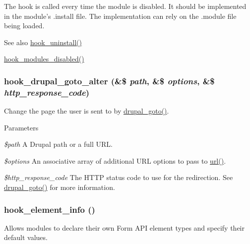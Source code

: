 The hook is called every time the module is disabled. It should be implemented in the module's .install file. The implementation can rely on the .module file being loaded.

\begin{DoxySeeAlso}{See also}
\hyperlink{group__hooks_ga3fb24f6923b3e585d6326ff5abdcc57c}{hook\_\-uninstall()} 

\hyperlink{group__hooks_ga591c577fba8ca8dc8ec17f8bf80bdc4c}{hook\_\-modules\_\-disabled()} 
\end{DoxySeeAlso}
\hypertarget{group__hooks_ga3c043f34f18e1c77daa341038a28e1ba}{
\subsubsection[{hook\_\-drupal\_\-goto\_\-alter}]{\setlength{\rightskip}{0pt plus 5cm}hook\_\-drupal\_\-goto\_\-alter (\&\$ {\em path}, \/  \&\$ {\em options}, \/  \&\$ {\em http\_\-response\_\-code})}}
\label{group__hooks_ga3c043f34f18e1c77daa341038a28e1ba}
Change the page the user is sent to by \hyperlink{group__http__handling_ga5b68d7a934713d1d623b2b32a732235d}{drupal\_\-goto()}.


\begin{DoxyParams}{Parameters}
\item[{\em \$path}]A Drupal path or a full URL. \item[{\em \$options}]An associative array of additional URL options to pass to \hyperlink{common_8inc_a43b2a0594431556db49df980801d8807}{url()}. \item[{\em \$http\_\-response\_\-code}]The HTTP status code to use for the redirection. See \hyperlink{group__http__handling_ga5b68d7a934713d1d623b2b32a732235d}{drupal\_\-goto()} for more information. \end{DoxyParams}
\hypertarget{group__hooks_ga3c5182432eddc82f8b7845e66a365d51}{
\subsubsection[{hook\_\-element\_\-info}]{\setlength{\rightskip}{0pt plus 5cm}hook\_\-element\_\-info ()}}
\label{group__hooks_ga3c5182432eddc82f8b7845e66a365d51}
Allows modules to declare their own Form API element types and specify their default values.

